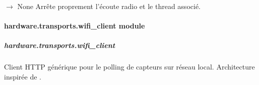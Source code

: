\documentclass[letterpaper,10pt,french]{sphinxmanual}
\begin{document}
\begin{fulllineitems}
\begin{fulllineitems}
\begin{quote}
\begin{description}
\end{description}\end{quote}

\end{fulllineitems}


\begin{fulllineitems}
\label{\detokenize{api/hardware.transports:hardware.transports.nrf24_transport.Nrf24Transport.stop}}
\pysigstartsignatures
\pysiglinewithargsret
{}
{}
{{ $\rightarrow$ None}}
\pysigstopsignatures
\sphinxAtStartPar
Arrête proprement l’écoute radio et le thread associé.

\end{fulllineitems}


\end{fulllineitems}



\paragraph{hardware.transports.wifi\_client module}
\label{\detokenize{api/hardware.transports:module-hardware.transports.wifi_client}}\label{\detokenize{api/hardware.transports:hardware-transports-wifi-client-module}}

\subparagraph{hardware.transports.wifi\_client}
\label{\detokenize{api/hardware.transports:hardware-transports-wifi-client}}
\sphinxAtStartPar
Client HTTP générique pour le polling de capteurs sur réseau local.
Architecture inspirée de .
\end{document}
